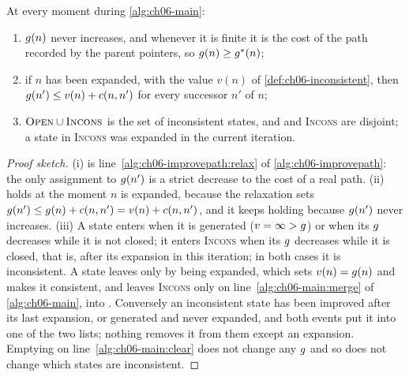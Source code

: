 \begin{lemma}
\label{thm:ch06-invariants}
At every moment during \cref{alg:ch06-main}:
\begin{enumerate}[label=(\roman*)]
  \item $g(n)$ never increases, and whenever it is finite it is the cost
        of the path recorded by the parent pointers, so $g(n) \ge
        g^*(n)$;
  \item if $n$ has been expanded, with the value $v(n)$ of
        \cref{def:ch06-inconsistent}, then $g(n') \le v(n) + c(n, n')$
        for every successor $n'$ of $n$;
  \item $\textsc{Open} \cup \textsc{Incons}$ is the set of inconsistent states, and
        \Open and \textsc{Incons} are disjoint; a state in \textsc{Incons} was
        expanded in the current iteration.
\end{enumerate}
\end{lemma}
\begin{proof}[Proof sketch]
(i) is line~\ref{alg:ch06-improvepath:relax} of \cref{alg:ch06-improvepath}:
the only assignment to $g(n')$ is a strict decrease to the cost of a real
path. (ii) holds at the moment $n$ is expanded, because the relaxation sets
$g(n') \le g(n) + c(n, n') = v(n) + c(n, n')$, and it keeps holding
because $g(n')$ never increases. (iii) A state enters \Open when it is
generated ($v = \infty > g$) or when its $g$ decreases while it is
not closed; it enters \textsc{Incons} when its $g$ decreases while it is
closed, that is, after its expansion in this iteration; in both cases it is
inconsistent. A state leaves \Open only by being expanded, which sets $v(n) =
g(n)$ and makes it consistent, and leaves \textsc{Incons} only on
line~\ref{alg:ch06-main:merge} of \cref{alg:ch06-main}, into \Open.
Conversely an inconsistent state has been improved after its last expansion,
or generated and never expanded, and both events put it into one of the two
lists; nothing removes it from them except an expansion. Emptying \Closed on
line~\ref{alg:ch06-main:clear} does not change any $g$ and so does not
change which states are inconsistent.
\end{proof}

